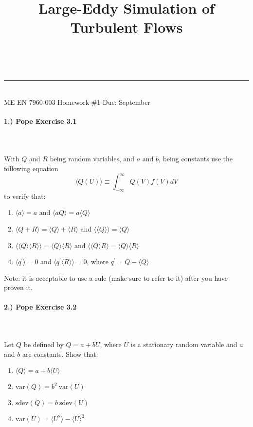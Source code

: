 \documentclass[11pt]{article}
\makeatletter
\newcommand{\linia}{\rule{\linewidth}{0.5pt}}
\renewcommand{\maketitle}{
\begin{center}
\vspace{2ex}
{\huge \textsc{\@title}}
\vspace{1ex}
\\
\linia\\
ME EN 7960-003 \hfill Homework \#1 \hfill Due: September \nth{20}
\vspace{4ex}
\end{center}
}
\makeatother
\begin{document}
\title{Large-Eddy Simulation of Turbulent Flows}

\maketitle

\vspace{-20pt}
\paragraph{1.) Pope Exercise 3.1}~\\\\
With $Q$ and $R$ being random variables, and $a$ and $b$, being constants use the following equation
$$\langle Q(U) \rangle \equiv \int^{\infty}_{-\infty} Q(V) f(V) dV$$
to verify that:

\begin{enumerate}[label=(\alph*),topsep=-10pt]
	\item $\langle a \rangle = a$ and $\langle a Q \rangle = a \langle Q \rangle$
	\item $\langle Q+R \rangle = \langle Q \rangle + \langle R \rangle$ and $\langle \langle Q \rangle \rangle = \langle Q \rangle$
	\item $\langle \langle Q \rangle \langle R \rangle \rangle = \langle Q \rangle \langle R \rangle$ and $\langle \langle Q \rangle R \rangle = \langle Q \rangle \langle R \rangle$
	\item $\langle q^{\prime} \rangle = 0$ and $\langle q^{\prime} \langle R \rangle \rangle = 0$, where $q^{\prime} = Q - \langle Q \rangle$
\end{enumerate}
Note: it is acceptable to use a rule (make sure to refer to it) after you have proven it.
 
\paragraph{2.) Pope Exercise 3.2}~\\\\
Let $Q$ be defined by $Q = a + bU$, where $U$ is a stationary random variable and $a$ and $b$ are constants. Show that:
\begin{enumerate}[label=(\alph*),topsep=-10pt]
	\item $\langle Q \rangle = a + b\langle U \rangle$
	\item $\text{var}(Q) = b^2\ \text{var}(U)$
	\item $\text{sdev}(Q) = b\ \text{sdev}(U)$
	\item $\text{var}(U) = \langle U^2 \rangle - {\langle U \rangle}^2$
\end{enumerate}
\end{document}
